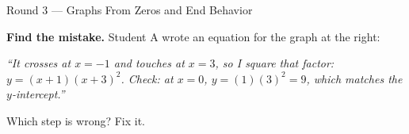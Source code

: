 \documentclass[12pt]{article}
\newcommand{\pgrid}[5]{%
  \draw[linegray!45, very thin, xstep=1, ystep=#5] (#1,#3) grid (#2,#4);
  \draw[->, semithick, charcoal] (#1,0)--(#2,0) node[right, font=\tiny, inner sep=1pt]{$x$};
  \draw[->, semithick, charcoal] (0,#3)--(0,#4) node[above, font=\tiny, inner sep=1pt]{$y$};}
\newcommand{\pcurve}[5]{%
  \begin{scope}\clip (#1,#3) rectangle (#2,#4);
    \draw[very thick, forest, domain=#1:#2, samples=160, smooth] plot (\x,{#5});
  \end{scope}}
\newcommand{\xtick}[1]{\foreach \t in {#1}{%
  \draw[charcoal] (\t,0) +(0,-2pt) -- +(0,2pt);
  \node[below, font=\tiny, inner sep=1.5pt, fill=white, fill opacity=0.8, text opacity=1]
    at (\t,0) {$\t$};}}
\newcommand{\ytick}[1]{\foreach \t in {#1}{%
  \draw[charcoal] (0,\t) +(-2pt,0) -- +(2pt,0);
  \node[left, font=\tiny, inner sep=1.5pt, fill=white, fill opacity=0.8, text opacity=1]
    at (0,\t) {$\t$};}}
\begin{document}
\begin{notesbox}{Round 3 --- Graphs From Zeros and End Behavior}
\vspace{6pt}
\noindent
\begin{minipage}[t]{0.66\linewidth}
\textbf{Find the mistake.} Student A wrote an equation for the graph at the right:\par
\vspace{2pt}
\emph{``It crosses at $x=-1$ and touches at $x=3$, so I square that factor:
$y=(x+1)(x+3)^2$. Check: at $x=0$, $y=(1)(3)^2=9$, which matches the $y$-intercept.''}\par
\vspace{2pt}
Which step is wrong? Fix it.
\end{minipage}\hfill
\begin{minipage}[t]{0.31\linewidth}
\vspace{0pt}\centering
{}
\end{minipage}\par
\vspace{2pt}
\end{notesbox}
\end{document}
